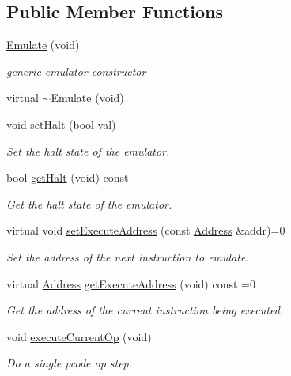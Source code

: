 \subsection*{Public Member Functions}
\begin{DoxyCompactItemize}
\item 
\mbox{\hyperlink{class_emulate_a4a919329a32fae8f2f79fce47f258820}{Emulate}} (void)
\begin{DoxyCompactList}\small\item\em generic emulator constructor \end{DoxyCompactList}\item 
virtual \mbox{\hyperlink{class_emulate_a52e7fc26f81d2901acfbff828e77ddff}{$\sim$\+Emulate}} (void)
\item 
void \mbox{\hyperlink{class_emulate_a4858bc80cf7b078a592f9c8d3442450d}{set\+Halt}} (bool val)
\begin{DoxyCompactList}\small\item\em Set the {\itshape halt} state of the emulator. \end{DoxyCompactList}\item 
bool \mbox{\hyperlink{class_emulate_ab1f2882dd3554c18c60e817e80f3c4bc}{get\+Halt}} (void) const
\begin{DoxyCompactList}\small\item\em Get the {\itshape halt} state of the emulator. \end{DoxyCompactList}\item 
virtual void \mbox{\hyperlink{class_emulate_aff5f9779fdad54f853d4e799f5289410}{set\+Execute\+Address}} (const \mbox{\hyperlink{class_address}{Address}} \&addr)=0
\begin{DoxyCompactList}\small\item\em Set the address of the next instruction to emulate. \end{DoxyCompactList}\item 
virtual \mbox{\hyperlink{class_address}{Address}} \mbox{\hyperlink{class_emulate_aeca3c773876b391304afffe2a5eff9de}{get\+Execute\+Address}} (void) const =0
\begin{DoxyCompactList}\small\item\em Get the address of the current instruction being executed. \end{DoxyCompactList}\item 
void \mbox{\hyperlink{class_emulate_aad37ba97a90d7cd5338a75afce3a21b9}{execute\+Current\+Op}} (void)
\begin{DoxyCompactList}\small\item\em Do a single pcode op step. \end{DoxyCompactList}\end{DoxyCompactItemize}
